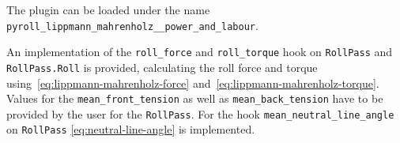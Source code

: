 \documentclass[11pt]{PyRollDocs}
\begin{document}
    The plugin can be loaded under the name \texttt{pyroll\_lippmann\_mahrenholz\_\_power\_and\_labour}.

    An implementation of the \lstinline{roll_force} and \lstinline{roll_torque} hook on \lstinline{RollPass} and \lstinline{RollPass.Roll} is provided,
    calculating the roll force and torque using~\eqref{eq:lippmann-mahrenholz-force} and~\eqref{eq:lippmann-mahrenholz-torque}.
    Values for the \lstinline{mean_front_tension} as well as \lstinline{mean_back_tension} have to be provided by the user for the \lstinline{RollPass}.
    For the hook \lstinline{mean_neutral_line_angle} on \lstinline{RollPass} \autoref{eq:neutral-line-angle} is implemented.

    \printbibliography
\end{document}
